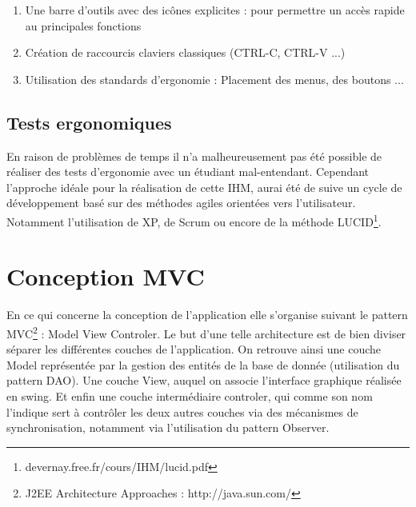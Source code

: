 \begin{enumerate}
 \item Une barre d'outils avec des icônes explicites : pour permettre un accès rapide au principales fonctions
 \item Création de raccourcis claviers classiques (CTRL-C, CTRL-V ...)
 \item Utilisation des standards d'ergonomie : Placement des menus, des boutons ...
\end{enumerate}

\subsection{Tests ergonomiques}

En raison de problèmes de temps il n'a malheureusement pas été possible de réaliser des tests d'ergonomie avec un étudiant mal-entendant. Cependant  l'approche idéale pour la réalisation de cette IHM, aurai été de suive un cycle de développement basé sur des méthodes agiles orientées vers l'utilisateur. Notamment l'utilisation de XP, de Scrum ou encore de la méthode LUCID\footnote{devernay.free.fr/cours/IHM/lucid.pdf}.


\section{Conception MVC}

En ce qui concerne la conception de l'application elle s'organise suivant le pattern MVC\footnote{J2EE Architecture Approaches : http://java.sun.com/} : Model View Controler. Le but d'une telle architecture est de bien diviser séparer les différentes couches de l'application. On retrouve ainsi une couche Model représentée par la gestion des entités de la base de donnée (utilisation du pattern DAO). Une couche View, auquel on associe l'interface graphique réalisée en swing. Et enfin une couche intermédiaire controler, qui comme son nom l'indique sert à contrôler les deux autres couches via des mécanismes de synchronisation, notamment via l'utilisation du pattern Observer. 




